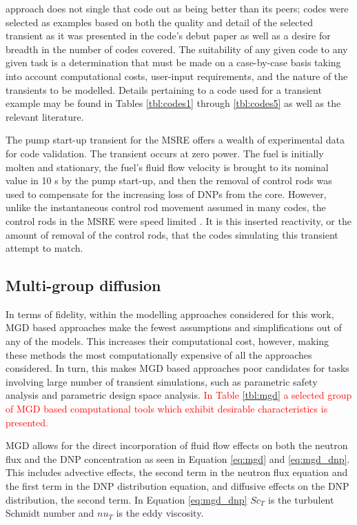 \documentclass[review]{elsarticle}
\begin{document}
approach does not single that code out as being better than its peers; codes
were selected as examples based on both the quality and detail of the selected
transient as it was presented in the code's debut paper as well as
a desire for breadth in the number of codes covered.
 The suitability of any given code to any given task
is a determination that must be made on a case-by-case basis taking into account
computational costs, user-input requirements, and the nature of the transients
to be modelled. Details pertaining
to a code used for a transient example may be found in Tables \ref{tbl:codes1}
through \ref{tbl:codes5} as
well as the relevant literature.
\par The pump start-up transient for the MSRE offers a wealth of experimental data for code validation.
The transient occurs at zero power. The fuel is initially molten and
stationary, the fuel's fluid flow velocity is brought to its nominal value in
10 s by the pump start-up, and then the removal of control rods was used to
compensate for the increasing loss of DNPs from the core. However, 
unlike the instantaneous control rod movement assumed in many codes, 
the control rods in the
MSRE were speed limited \cite{krepel_dyn3d-msr_2007}. It is this inserted
reactivity, or the amount of removal of the control rods, that the codes simulating
this transient attempt to match.

\subsection{Multi-group diffusion} \label{ssec:mgd}
In terms of fidelity, within the modelling approaches considered for this
work, MGD based approaches 
make the fewest assumptions and simplifications out of any of the models.
This increases their computational cost, however, making these methods
the most computationally expensive of all the approaches considered.
In turn, this makes MGD based
approaches poor candidates for tasks involving large number of transient
simulations, such as parametric safety analysis and parametric design space
analysis. \textcolor{red}{In Table \ref{tbl:mgd} a selected group of MGD based computational
tools which exhibit desirable characteristics is presented.}
\par MGD allows for the direct incorporation
of fluid flow effects on both the neutron flux and the DNP concentration as
seen in Equation \ref{eq:mgd} and \ref{eq:mgd_dnp}.
This includes advective effects, the second term in the neutron flux equation 
 and the first term in the DNP distribution equation, and diffusive effects on
 the DNP distribution, the second term. In Equation \ref{eq:mgd_dnp}
 $Sc_{T}$ is the turbulent Schmidt number and $nu_{T}$ is the eddy viscosity. 
\end{document}
